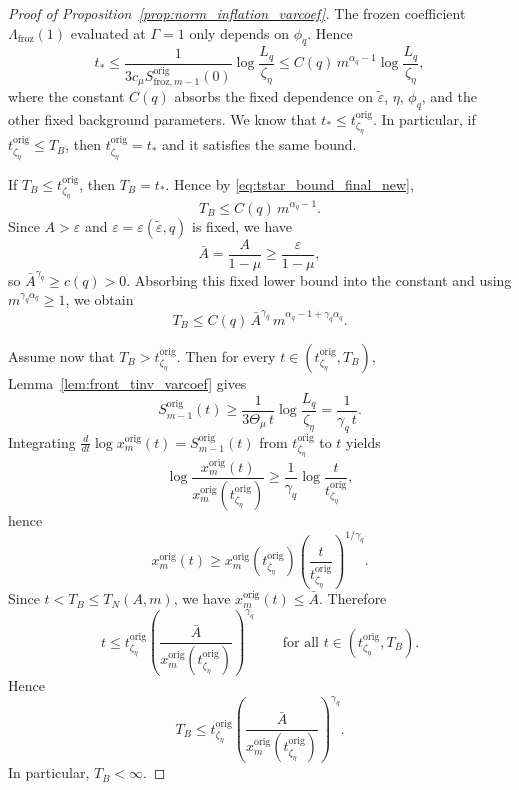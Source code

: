 \documentclass[reqno,11pt]{amsart}
\begin{document}
\begin{proof}[Proof of Proposition~\ref{prop:norm_inflation_varcoef}]
    The frozen coefficient $\Lambda_{\mathrm{froz}}(1)$ evaluated at $\Gamma=1$ only depends on $\phi_q$.
Hence
\begin{equation}
\label{eq:tstar_bound_final_new}
t_* \le 
\frac{1}{3c_\mu S_{\mathrm{froz},m-1}^{\mathrm{orig}}(0)}\log\frac{L_q}{\zeta_\eta}
\le C(q)\,m^{\alpha_q-1}\log\frac{L_q}{\zeta_\eta},
\end{equation}
where the constant $C(q)$ absorbs the fixed dependence on $\tilde\varepsilon$, $\eta$, $\phi_q$, and the other fixed background parameters.
We know that $t_*\leq t_{\zeta_\eta}^{\mathrm{orig}}$. In particular, if $t_{\zeta_\eta}^{\mathrm{orig}}\le T_B$, then $t_{\zeta_\eta}^{\mathrm{orig}}=t_*$ and it satisfies the same bound.


\smallskip
{}
If $T_B\le t_{\zeta_\eta}^{\mathrm{orig}}$, then $T_B=t_*$. Hence by \eqref{eq:tstar_bound_final_new},
\[
T_B \le C(q)\,m^{\alpha_q-1}.
\]
Since $A>\varepsilon$ and $\varepsilon=\varepsilon(\tilde\varepsilon,q)$ is fixed, we have
\[
\bar A=\frac{A}{1-\mu}\ge \frac{\varepsilon}{1-\mu},
\]
so $\bar A^{\gamma_q}\ge c(q)>0$. Absorbing this fixed lower bound into the constant and using
$m^{\gamma_q\alpha_q}\ge 1$, we obtain
\[
T_B \le C(q)\,\bar A^{\gamma_q}\,m^{\alpha_q-1+\gamma_q\alpha_q}.
\]


Assume now that $T_B>t_{\zeta_\eta}^{\mathrm{orig}}$. Then for every
$t\in(t_{\zeta_\eta}^{\mathrm{orig}},T_B)$,
Lemma~\ref{lem:front_tinv_varcoef} gives
\[
S_{m-1}^{\mathrm{orig}}(t)\ge \frac{1}{3\Theta_\mu\,t}\log\frac{L_q}{\zeta_\eta}
= \frac{1}{\gamma_q\,t}.
\]
Integrating $\frac{d}{dt}\log x_m^{\mathrm{orig}}(t)=S_{m-1}^{\mathrm{orig}}(t)$ from
$t_{\zeta_\eta}^{\mathrm{orig}}$ to $t$ yields
\[
\log\frac{x_m^{\mathrm{orig}}(t)}{x_m^{\mathrm{orig}}(t_{\zeta_\eta}^{\mathrm{orig}})}
\ge \frac{1}{\gamma_q}\log\frac{t}{t_{\zeta_\eta}^{\mathrm{orig}}},
\]
hence
\[
x_m^{\mathrm{orig}}(t)\ge x_m^{\mathrm{orig}}(t_{\zeta_\eta}^{\mathrm{orig}})
\left(\frac{t}{t_{\zeta_\eta}^{\mathrm{orig}}}\right)^{1/\gamma_q}.
\]
Since $t<T_B\le T_N(A,m)$, we have $x_m^{\mathrm{orig}}(t)\le \bar A$. Therefore
\[
t\le t_{\zeta_\eta}^{\mathrm{orig}}
\left(\frac{\bar A}{x_m^{\mathrm{orig}}(t_{\zeta_\eta}^{\mathrm{orig}})}\right)^{\gamma_q}
\qquad\text{for all }t\in(t_{\zeta_\eta}^{\mathrm{orig}},T_B).
\]
Hence
\[
T_B\le t_{\zeta_\eta}^{\mathrm{orig}}
\left(\frac{\bar A}{x_m^{\mathrm{orig}}(t_{\zeta_\eta}^{\mathrm{orig}})}\right)^{\gamma_q}.
\]
In particular, $T_B< \infty$.





\end{proof}
\end{document}
